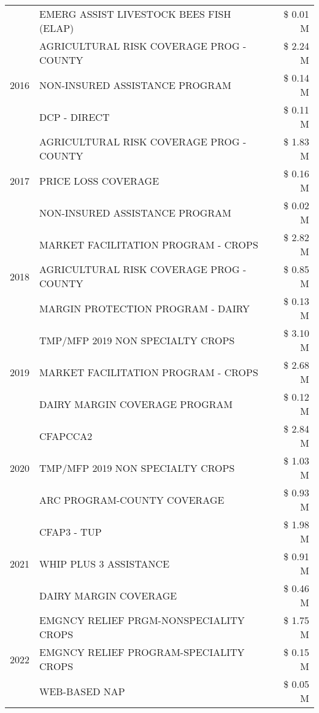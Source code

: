 \begin{tabular}{llr}
 & EMERG ASSIST LIVESTOCK BEES FISH (ELAP) & \$ 0.01 M \\
\cline{1-3}
\multirow[t]{3}{*}{2016} & AGRICULTURAL RISK COVERAGE PROG - COUNTY & \$ 2.24 M \\
 & NON-INSURED ASSISTANCE PROGRAM & \$ 0.14 M \\
 & DCP - DIRECT & \$ 0.11 M \\
\cline{1-3}
\multirow[t]{3}{*}{2017} & AGRICULTURAL RISK COVERAGE PROG - COUNTY & \$ 1.83 M \\
 & PRICE LOSS COVERAGE & \$ 0.16 M \\
 & NON-INSURED ASSISTANCE PROGRAM & \$ 0.02 M \\
\cline{1-3}
\multirow[t]{3}{*}{2018} & MARKET FACILITATION PROGRAM - CROPS & \$ 2.82 M \\
 & AGRICULTURAL RISK COVERAGE PROG - COUNTY & \$ 0.85 M \\
 & MARGIN PROTECTION PROGRAM - DAIRY & \$ 0.13 M \\
\cline{1-3}
\multirow[t]{3}{*}{2019} & TMP/MFP 2019 NON SPECIALTY CROPS & \$ 3.10 M \\
 & MARKET FACILITATION PROGRAM - CROPS & \$ 2.68 M \\
 & DAIRY MARGIN COVERAGE PROGRAM & \$ 0.12 M \\
\cline{1-3}
\multirow[t]{3}{*}{2020} & CFAPCCA2 & \$ 2.84 M \\
 & TMP/MFP 2019 NON SPECIALTY CROPS & \$ 1.03 M \\
 & ARC PROGRAM-COUNTY COVERAGE & \$ 0.93 M \\
\cline{1-3}
\multirow[t]{3}{*}{2021} & CFAP3 - TUP & \$ 1.98 M \\
 & WHIP PLUS 3 ASSISTANCE & \$ 0.91 M \\
 & DAIRY MARGIN COVERAGE & \$ 0.46 M \\
\cline{1-3}
\multirow[t]{3}{*}{2022} & EMGNCY RELIEF PRGM-NONSPECIALITY CROPS & \$ 1.75 M \\
 & EMGNCY RELIEF PROGRAM-SPECIALITY CROPS & \$ 0.15 M \\
 & WEB-BASED NAP & \$ 0.05 M \\
\cline{1-3}
\bottomrule
\end{tabular}
